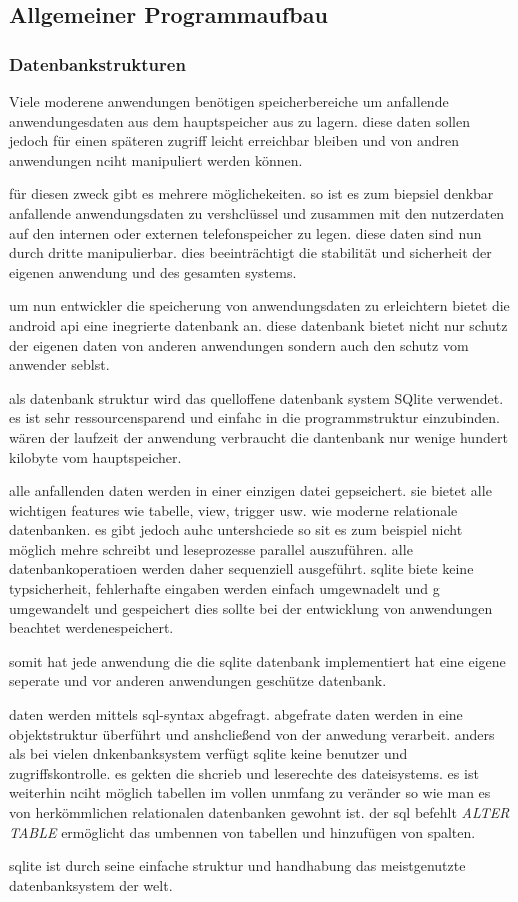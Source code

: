 \subsection{Allgemeiner Programmaufbau}
\subsubsection{Datenbankstrukturen}
\label{Datenbankstrukturen}
Viele moderene anwendungen benötigen speicherbereiche um anfallende anwendungesdaten aus dem hauptspeicher aus zu lagern. diese daten sollen jedoch für einen späteren zugriff leicht erreichbar bleiben und von andren anwendungen nciht manipuliert werden können.

für diesen zweck gibt es mehrere möglichekeiten. so ist es zum biepsiel denkbar anfallende anwendungsdaten zu vershclüssel und zusammen mit den nutzerdaten auf den internen oder externen telefonspeicher zu legen. diese daten sind nun durch dritte manipulierbar. dies beeinträchtigt die stabilität und sicherheit der eigenen anwendung und des gesamten systems.

um nun entwickler die speicherung von anwendungsdaten zu erleichtern bietet die android api eine inegrierte datenbank an. diese datenbank bietet nicht nur schutz der eigenen daten von anderen anwendungen sondern auch den schutz vom anwender seblst.

als datenbank struktur wird das quelloffene datenbank system SQlite verwendet. es ist sehr ressourcensparend und einfahc in die programmstruktur einzubinden. wären der laufzeit der anwendung verbraucht die dantenbank nur wenige hundert kilobyte vom hauptspeicher.

alle anfallenden daten werden in einer einzigen datei gepseichert. sie bietet alle wichtigen features wie tabelle, view, trigger usw. wie moderne relationale datenbanken. es gibt jedoch auhc untershciede so sit es zum beispiel nicht möglich mehre schreibt und leseprozesse parallel auszuführen. alle datenbankoperatioen werden daher sequenziell ausgeführt. sqlite biete keine typsicherheit, fehlerhafte eingaben werden einfach umgewnadelt und g umgewandelt und gespeichert dies sollte bei der entwicklung von anwendungen beachtet werdenespeichert.

somit hat jede anwendung die die sqlite datenbank implementiert hat eine eigene seperate und vor anderen anwendungen geschütze datenbank.

daten werden mittels sql-syntax abgefragt. abgefrate daten werden in eine objektstruktur überführt und anshcließend von der anwedung verarbeit. anders als bei vielen dnkenbanksystem verfügt sqlite keine benutzer und zugriffskontrolle. es gekten die shcrieb und leserechte des dateisystems. es ist weiterhin nciht möglich tabellen im vollen unmfang zu veränder so wie man es von herkömmlichen relationalen datenbanken gewohnt ist. der sql befehlt \textit{ALTER TABLE} ermöglicht das umbennen von tabellen und hinzufügen von spalten.

sqlite ist durch seine einfache struktur und handhabung das meistgenutzte datenbanksystem der welt.

